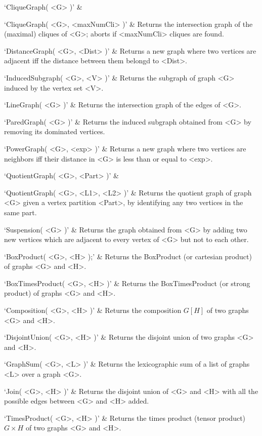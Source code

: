 `CliqueGraph( <G> )' &

`CliqueGraph( <G>, <maxNumCli> )' & 
Returns the intersection graph of the (maximal) cliques of <G>; aborts if <maxNumCli> cliques are found.

`DistanceGraph( <G>, <Dist> )' & 
Returns a new graph where two vertices are adjacent iff the distance between them belongd to <Dist>.

`InducedSubgraph( <G>, <V> )' & 
Returns the subgraph of graph <G> induced by the vertex set <V>.

`LineGraph( <G> )' & 
Returns the intersection graph of the edges of <G>.

`ParedGraph( <G> )' & 
Returns the induced subgraph obtained from   <G>  by  removing  its  dominated  vertices.

`PowerGraph( <G>, <exp> )' & 
Returns a new graph where two vertices are neighbors iff their distance in <G> is less than or equal to <exp>.

`QuotientGraph( <G>, <Part> )' & 

`QuotientGraph( <G>, <L1>, <L2> )' & 
Returns the quotient graph of graph <G> given a vertex partition <Part>, by identifying any two vertices in the same part.

`Suspension( <G> )' & 
Returns the graph obtained from  <G> by adding two new vertices which are adjacent to every
vertex of <G> but not to each other.
\enditems


\beginitems
`BoxProduct( <G>, <H> );' & 
Returns the BoxProduct (or cartesian product) of graphs <G> and <H>.

`BoxTimesProduct( <G>, <H> )' & 
Returns the BoxTimesProduct (or strong product) of graphs <G> and <H>.

`Composition( <G>, <H> )' & 
Returns the composition $G[H]$ of two graphs <G> and <H>.

`DisjointUnion( <G>, <H> )' & 
Returns the disjoint union of two graphs <G> and <H>.

`GraphSum( <G>, <L> )' & 
Returns the lexicographic sum of a list of graphs <L> over a graph <G>.

`Join( <G>, <H> )' & 
Returns the disjoint union of <G> and <H> with all the possible edges between <G> and <H> added.

`TimesProduct( <G>, <H> )' & 
Returns  the  times  product (tensor product) $G  \times  H$ of two graphs <G> and <H>.
\enditems

